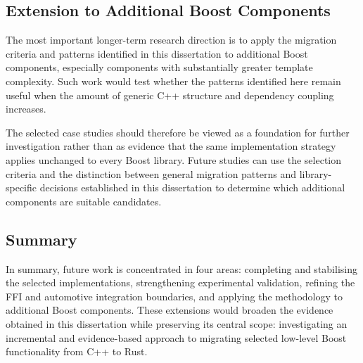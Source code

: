 \subsection{Extension to Additional Boost Components}

The most important longer-term research direction is to apply the migration
criteria and patterns identified in this dissertation to additional Boost
components, especially components with substantially greater template
complexity. Such work would test whether the patterns identified here remain
useful when the amount of generic C++ structure and dependency coupling
increases.

The selected case studies should therefore be viewed as a foundation for
further investigation rather than as evidence that the same implementation
strategy applies unchanged to every Boost library. Future studies can use the
selection criteria and the distinction between general migration patterns and
library-specific decisions established in this dissertation to determine
which additional components are suitable candidates.

\subsection{Summary}

In summary, future work is concentrated in four areas: completing and
stabilising the selected implementations, strengthening experimental
validation, refining the FFI and automotive integration boundaries, and
applying the methodology to additional Boost components. These extensions
would broaden the evidence obtained in this dissertation while preserving
its central scope: investigating an incremental and evidence-based approach
to migrating selected low-level Boost functionality from C++ to Rust.
